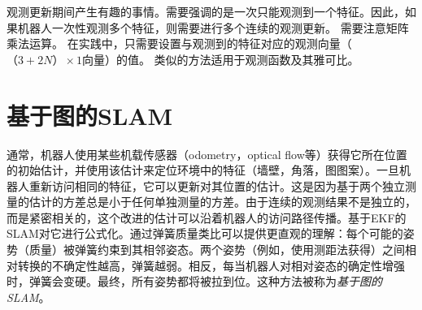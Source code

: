 
观测更新期间产生有趣的事情。需要强调的是一次只能观测到一个特征。因此，如果机器人一次性观测多个特征，则需要进行多个连续的观测更新。 需要注意矩阵乘法运算。 在实践中，只需要设置与观测到的特征对应的观测向量（$（3 + 2N）\times 1 $向量）的值。 类似的方法适用于观测函数及其雅可比。

\section{基于图的SLAM}


通常，机器人使用某些机载传感器（odometry，optical flow等）获得它所在位置的初始估计，并使用该估计来定位环境中的特征（墙壁，角落，图图案）。一旦机器人重新访问相同的特征，它可以更新对其位置的估计。这是因为基于两个独立测量的估计的方差总是小于任何单独测量的方差。由于连续的观测结果不是独立的，而是紧密相关的，这个改进的估计可以沿着机器人的访问路径传播。基于EKF的SLAM对它进行公式化。通过弹簧质量类比可以提供更直观的理解：每个可能的姿势（质量）被弹簧约束到其相邻姿态。两个姿势（例如，使用测距法获得）之间相对转换的不确定性越高，弹簧越弱。相反，每当机器人对相对姿态的确定性增强时，弹簧会变硬。最终，所有姿势都将被拉到位。这种方法被称为\emph{基于图的SLAM}。

